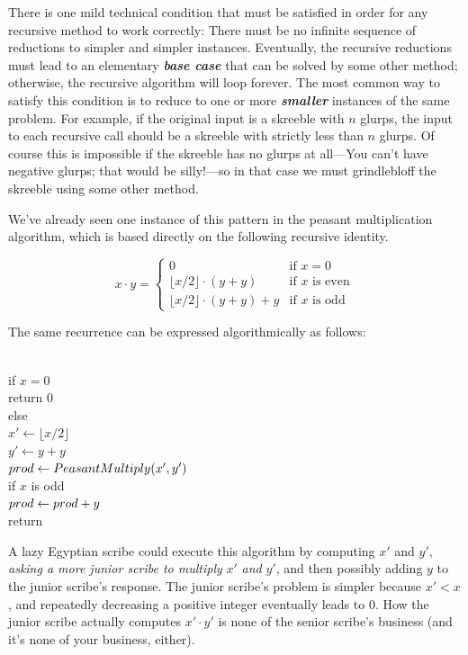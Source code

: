 There is one mild technical condition that must be satisfied in order for any recursive method to work correctly: There must be no infinite sequence of reductions to simpler and simpler instances. Eventually, the recursive reductions must lead to an elementary \textbf{\textit{base case}} that can be solved by some other method; otherwise, the recursive algorithm will loop forever. The most common way to satisfy this condition is to reduce to one or more \textbf{\textit{smaller}} instances of the same problem. For example, if the original input is a skreeble with $n$ glurps, the input to each recursive call should be a skreeble with strictly less than $n$ glurps. Of course this is impossible if the skreeble has no glurps at all—You can’t have negative glurps; that would be silly!—so in that case we must grindlebloff the skreeble using some other method.

We’ve already seen one instance of this pattern in the peasant multiplication algorithm, which is based directly on the following recursive identity.

\[
x \cdot y = \begin{cases}
0 & \text{if } x = 0\\
\lfloor x/2\rfloor \cdot (y + y) & \text{if } x \text{ is even}\\
\lfloor x/2\rfloor \cdot (y + y) + y & \text{if } x \text{ is odd}
\end{cases}
\]

The same recurrence can be expressed algorithmically as follows:

\begin{pseudocode}
\\
if $x = 0$\\
\Indent return $0$\\
else\\
\Indent $x' \gets \lfloor x/2\rfloor$\\
\Indent $y' \gets y + y$\\
\Indent $prod \gets PeasantMultiply(x', y')$ \\
\Indent if $x$ is odd\\
\Indent\Indent $prod \gets prod + y$\\
\Indent return 
\end{pseudocode}

\noindent A lazy Egyptian scribe could execute this algorithm by computing $x'$ and $y'$, \emph{asking a more junior scribe to multiply} $x'$ \emph{and} $y'$, and then possibly adding $y$ to the junior scribe’s response. The junior scribe’s problem is simpler because $x' < x$, and repeatedly decreasing a positive integer eventually leads to $0$. How the junior scribe actually computes $x' \cdot y'$ is none of the senior scribe’s business (and it’s none of your business, either).

